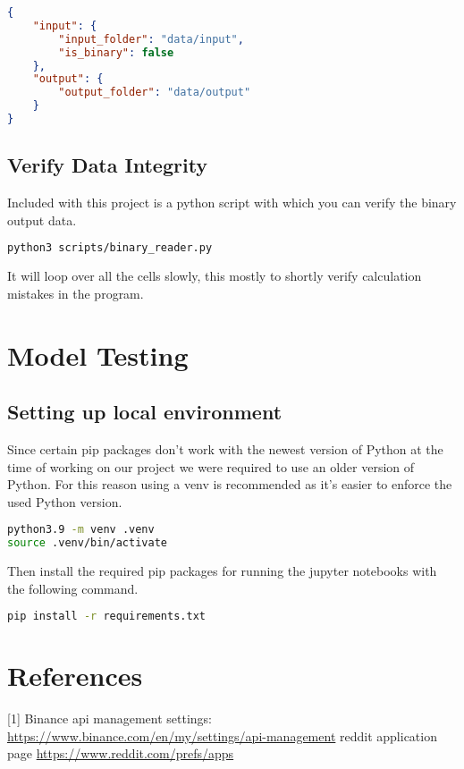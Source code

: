 \documentclass[12pt,a4paper]{article}
\begin{document}
\begin{lstlisting}[language=json]
{
    "input": {
        "input_folder": "data/input",
        "is_binary": false
    },
    "output": {
        "output_folder": "data/output"
    }
}
\end{lstlisting}


\subsection{Verify Data Integrity}

Included with this project is a python script with which you can verify the binary output data.

\begin{lstlisting}[language=bash]
python3 scripts/binary_reader.py
\end{lstlisting}

It will loop over all the cells slowly, this mostly to shortly verify calculation mistakes in the program.

\section{Model Testing}

\subsection{Setting up local environment}

Since certain pip packages don't work with the newest version of Python at the time of working on our project we were required to use an older version of Python. For this reason using a venv is recommended as it's easier to enforce the used Python version.

\begin{lstlisting}[language=bash]
python3.9 -m venv .venv
source .venv/bin/activate
\end{lstlisting}

Then install the required pip packages for running the jupyter notebooks with the following command.

\begin{lstlisting}[language=bash]
pip install -r requirements.txt
\end{lstlisting}

\section{References}
[1] Binance api management settings: \newline \href{https://www.binance.com/en/my/settings/api-management}{https://www.binance.com/en/my/settings/api-management}
\newline
[2] reddit application page \href{https://www.reddit.com/prefs/apps}{https://www.reddit.com/prefs/apps}
\end{document}
